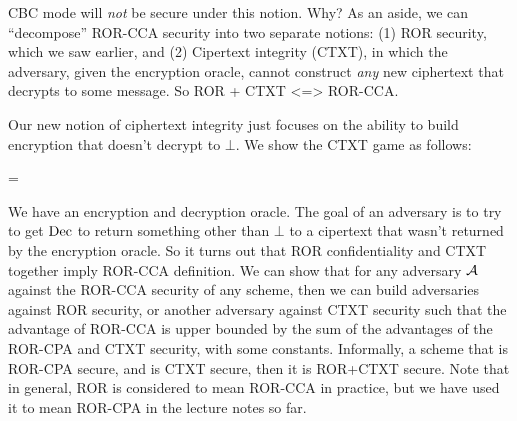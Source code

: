 CBC mode will \emph{not} be secure under this notion. Why? As an aside, we can ``decompose'' ROR-CCA security into two separate notions: (1) ROR security, which we saw earlier, and (2) Cipertext integrity (CTXT), in which the adversary, given the encryption oracle, cannot construct \emph{any} new ciphertext that decrypts to some message. So ROR + CTXT <=> ROR-CCA.

Our new notion of ciphertext integrity just focuses on the ability to build encryption that doesn't decrypt to $\bot$. We show the CTXT game as follows:\\


\bnm
\AdvCTXT{\SE}{\advA} = \Prob{\CTXT_\SE^\advA\Rightarrow\true}\\
\enm

We have an encryption and decryption oracle. The goal of an adversary is to try to get $\textnormal{Dec}$ to return something other than $\bot$ to a cipertext that wasn't returned by the encryption oracle. So it turns out that ROR confidentiality and CTXT together imply ROR-CCA definition. We can show that for any adversary ${\mathcal A}$ against the ROR-CCA security of any scheme, then we can build adversaries against ROR security, or another adversary against CTXT security such that the advantage of ROR-CCA is upper bounded by the sum of the advantages of the ROR-CPA and CTXT security, with some constants. Informally, a scheme that is ROR-CPA secure, and is CTXT secure, then it is ROR+CTXT secure.  Note that in general, ROR is considered to mean ROR-CCA in practice, but we have used it to mean ROR-CPA in the lecture notes so far.

